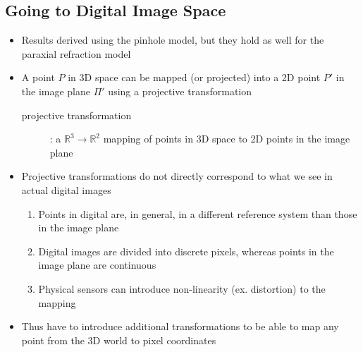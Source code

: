 \documentclass[letterpaper,12pt]{article}
\begin{document}
\subsection{Going to Digital Image Space}
\begin{itemize}
 \item Results derived using the pinhole model, but they hold as well for the paraxial refraction model
 \item A point $P$ in 3D space can be mapped (or projected) into a 2D point $P'$ in the image plane $\Pi'$ using a projective transformation
       \begin{description}
        \item[projective transformation]: a $\mathbb{R}^3 \to \mathbb{R}^2$ mapping of points in 3D space to 2D points in the image plane
       \end{description}
 \item Projective transformations do not directly correspond to what we see in actual digital images
       \begin{enumerate}
        \item Points in digital are, in general, in a different reference system than those in the image plane
        \item Digital images are divided into discrete pixels, whereas points in the image plane are continuous
        \item Physical sensors can introduce non-linearity (ex. distortion) to the mapping
       \end{enumerate}
 \item Thus have to introduce additional transformations to be able to map any point from the 3D world to pixel coordinates
\end{itemize}
\end{document}
